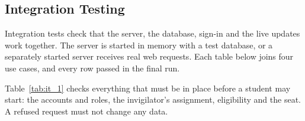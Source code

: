 \subsection{Integration Testing}
\label{sec:it_cases}

Integration tests check that the server, the database, sign-in and the live updates work together. The server is started in memory with a test database, or a separately started server receives real web requests. Each table below joins four use cases, and every row passed in the final run.

Table~\ref{tab:it_1} checks everything that must be in place before a student may start: the accounts and roles, the invigilator's assignment, eligibility and the seat. A refused request must not change any data.

